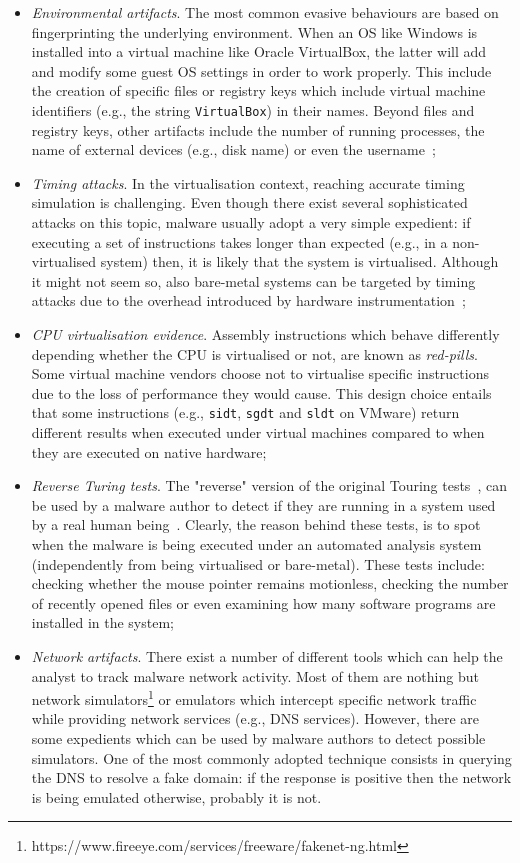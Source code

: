 \documentclass[LaM,binding=0.6cm]{sapthesis}
\begin{document}
\begin{itemize}
\item \textit{Environmental artifacts}. The most common evasive behaviours are based on fingerprinting the underlying environment. When an OS like Windows is installed into a virtual machine like Oracle VirtualBox, the latter will add and modify some guest OS settings in order to work properly. This include the creation of specific files or registry keys which include virtual machine identifiers (e.g., the string \texttt{VirtualBox}) in their names. Beyond files and registry keys, other artifacts include the number of running processes, the name of external devices (e.g., disk name) or even the username~\cite{lindorfer2011detecting};
\item \textit{Timing attacks}. In the virtualisation context, reaching accurate timing simulation is challenging. Even though there exist several sophisticated attacks on this topic, malware usually adopt a very simple expedient: if executing a set of instructions takes longer than expected (e.g., in a non-virtualised system) then, it is likely that the system is virtualised. Although it might not seem so, also bare-metal systems can be targeted by timing attacks due to the overhead introduced by hardware instrumentation~\cite{spensky2016phi};
\item \textit{CPU virtualisation evidence}. Assembly instructions which behave differently depending whether the CPU is virtualised or not, are known as \textit{red-pills}. Some virtual machine vendors choose not to virtualise specific instructions due to the loss of performance they would cause. This design choice entails that some instructions (e.g., \texttt{sidt}, \texttt{sgdt} and \texttt{sldt} on VMware) return different results when executed under virtual machines compared to when they are executed on native hardware;
\item \textit{Reverse Turing tests}. The "reverse" version of the original Touring tests~\cite{turing2009computing}, can be used by a malware author to detect if they are running in a system used by a real human being~\cite{miramirkhani2017spotless}. Clearly, the reason behind these tests, is to spot when the malware is being executed under an automated analysis system (independently from being virtualised or bare-metal). These tests include: checking whether the mouse pointer remains motionless, checking the number of recently opened files or even examining how many software programs are installed in the system;
\item \textit{Network artifacts}. There exist a number of different tools which can help the analyst to track malware network activity. Most of them are nothing but network simulators\footnote{https://www.fireeye.com/services/freeware/fakenet-ng.html} or emulators which intercept specific network traffic while providing network services (e.g., DNS services). However, there are some expedients which can be used by malware authors to detect possible simulators. One of the most commonly adopted technique consists in querying the DNS to resolve a fake domain: if the response is positive then the network is being emulated otherwise, probably it is not.
\end{itemize}
\end{document}
